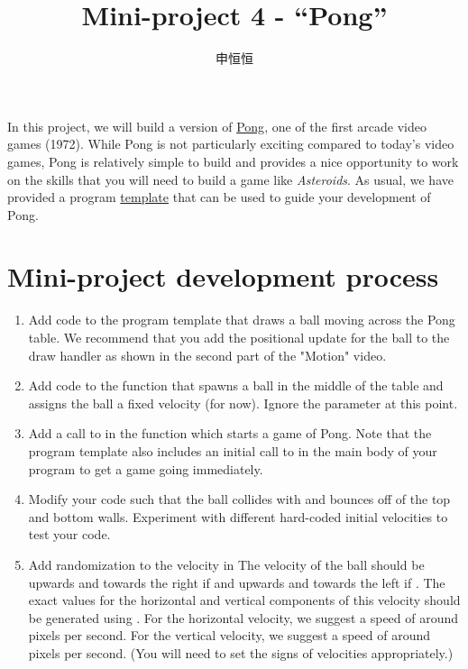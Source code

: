 \documentclass[a4paper,10pt]{article}
\title{Mini-project 4 - “Pong”}
\author{申恒恒}
\begin{document}
\begin{CJK}{UTF8}{gkai}
\maketitle

In this project, we will build a version of \href{http://en.wikipedia.org/wiki/Pong}{Pong}, one of the first arcade video games (1972). While Pong is not particularly exciting compared to today's video games, Pong is relatively simple to build and provides a nice opportunity to work on the skills that you will need to build a game like \textit{Asteroids}. As usual, we have provided a program \href{http://www.codeskulptor.org/#examples-pong_template.py}{template} that can be used to guide your development of Pong.

\section*{Mini-project development process}
\begin{enumerate}

\item Add code to the program template that draws a ball moving across the Pong table. We recommend that you add the positional update for the ball to the draw handler as shown in the second part of the "Motion" video.
\item Add code to the function {\color{red}{spawn\_ball}} that spawns a ball in the middle of the table and assigns the ball a fixed velocity (for now). Ignore the parameter {\color{red}{directionl}} at this point.

\item Add a call to {\color{red}{spawn\_ball}} in the function {\color{red}{new\_game}} which starts a game of Pong. Note that the program template also includes an initial call to {\color{red}{new\_game}} in the main body of your program to get a game going immediately.

\item Modify your code such that the ball collides with and bounces off of the top and bottom walls. Experiment with different hard-coded initial velocities to test your code.

\item Add randomization to the velocity in {\color{red}{spawn\_ball(direction)}} The velocity of the ball should be upwards and towards the right if {\color{red}{direction == RIGHT}} and upwards and towards the left if {\color{red}{direction == LEFT}}. The exact values for the horizontal and vertical components of this velocity should be generated using {\color{red}{random.randrange()}}. For the horizontal velocity, we suggest a speed of around {\color{red}{random.randrange(120, 240)}} pixels per second. For the vertical velocity, we suggest a speed of around {\color{red}{random.randrange(60, 180)}} pixels per second. (You will need to set the signs of velocities appropriately.)


\end{enumerate}
\end{CJK}
\end{document}
